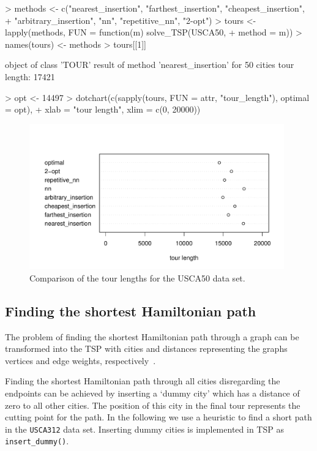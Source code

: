 \documentclass[10pt,a4paper,fleqn]{article}
\newcommand{\strong}[1]{{\normalfont\fontseries{b}\selectfont #1}}
\newcommand{\func}[1]{\mbox{\texttt{#1()}}}
\newcommand{\code}[1]{\mbox{\texttt{#1}}}
\newcommand{\pkg}[1]{\strong{#1}}
\begin{document}
\begin{Schunk}
\begin{Sinput}
> methods <- c("nearest_insertion", "farthest_insertion", "cheapest_insertion", 
+     "arbitrary_insertion", "nn", "repetitive_nn", "2-opt")
> tours <- lapply(methods, FUN = function(m) solve_TSP(USCA50, 
+     method = m))
> names(tours) <- methods
> tours[[1]]
\end{Sinput}
\begin{Soutput}
object of class 'TOUR' 
result of method 'nearest_insertion' for 50 cities
tour length: 17421 
\end{Soutput}
\begin{Sinput}
> opt <- 14497
> dotchart(c(sapply(tours, FUN = attr, "tour_length"), optimal = opt), 
+     xlab = "tour length", xlim = c(0, 20000))
\end{Sinput}
\end{Schunk}

\begin{figure}
\centering
\includegraphics[width=11cm, trim=0 10 0 0]{TSP-dotchart_USCA50}
\caption{Comparison of the tour lengths for the USCA50 data set.}
\label{fig:dotchart}
\end{figure}


\subsection{Finding the shortest Hamiltonian path}

The problem of finding the shortest Hamiltonian path through a graph can be
transformed into the TSP with cities and distances representing the graphs
vertices and edge weights, respectively~\citep{Garfinkel1985}. 

Finding the shortest Hamiltonian path through all cities disregarding
the endpoints can be achieved by inserting a `dummy city' which has a
distance of zero to all other cities. The position of this city in the
final tour represents the cutting point for the path. In the following
we use a heuristic to find a short path in the \code{USCA312} data set.
Inserting dummy cities is implemented in \pkg{TSP} as
\func{insert\_dummy}.
\end{document}
